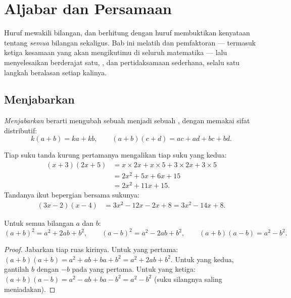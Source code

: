 \chapter{Aljabar dan Persamaan}\label{ch:g9:algebra}

Huruf mewakili bilangan, dan berhitung dengan huruf membuktikan
kenyataan tentang \emph{semua} bilangan sekaligus. Bab ini melatih
 dan pemfaktoran --- termasuk ketiga kesamaan yang akan
mengikutimu di seluruh matematika --- lalu menyelesaikan 
berderajat satu,  , dan pertidaksamaan sederhana,
selalu satu langkah beralasan setiap kalinya.

\section{Menjabarkan}

\begin{definition}[Menjabarkan]\label{def:g9:algebra:expand}
\emph{Menjabarkan} berarti mengubah sebuah  menjadi sebuah , dengan memakai sifat distributif:
\[
k(a + b) = ka + kb,
\qquad
(a + b)(c + d) = ac + ad + bc + bd .
\]
\end{definition}

\begin{example}\label{ex:g9:algebra:expand}
Tiap suku tanda kurung pertamanya mengalikan tiap suku yang kedua:
\begin{align*}
(x + 3)(2x + 5)
&= x \times 2x + x \times 5 + 3 \times 2x + 3 \times 5 \\
&= 2x^2 + 5x + 6x + 15 \\
&= 2x^2 + 11x + 15 .
\end{align*}
Tandanya ikut bepergian bersama sukunya:
\begin{align*}
(3x - 2)(x - 4)
&= 3x^2 - 12x - 2x + 8
= 3x^2 - 14x + 8 .
\end{align*}
\end{example}

\begin{theorem}\label{thm:g9:algebra:identities}
Untuk semua bilangan $a$ dan $b$:
\[
(a+b)^2 = a^2 + 2ab + b^2,
\qquad
(a-b)^2 = a^2 - 2ab + b^2,
\qquad
(a+b)(a-b) = a^2 - b^2 .
\]
\end{theorem}

\begin{proof}
Jabarkan tiap ruas kirinya. Untuk yang pertama:
$(a+b)(a+b) = a^2 + ab + ba + b^2 = a^2 + 2ab + b^2$. Untuk yang
kedua, gantilah $b$ dengan $-b$ pada yang pertama. Untuk yang ketiga:
$(a+b)(a-b) = a^2 - ab + ba - b^2 = a^2 - b^2$ (suku silangnya saling
meniadakan).
\end{proof}

